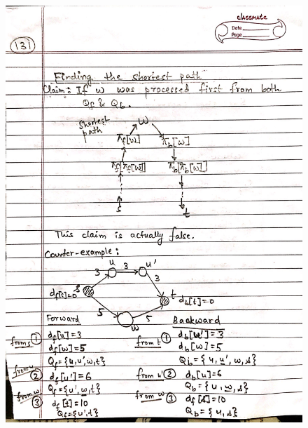 \begin{figure}[H]
    \centering
    \includegraphics[scale=0.25]{"./MIT 6.006/MIT_6006_131"}
\end{figure}
\newpage

